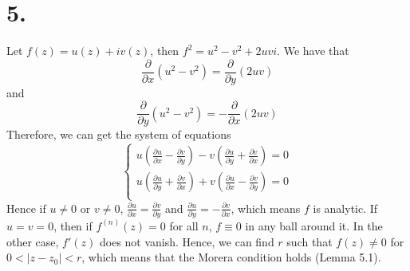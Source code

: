 \documentclass[11pt]{article}
\begin{document}
\section*{5.}
Let $f(z) = u(z) + iv(z)$, then $f^2 = u^2-v^2+2uvi$. We have that 
\[
    \frac{\partial }{\partial x}(u^2-v^2) = \frac{\partial }{\partial y}(2uv)    
\]
and 
\[
    \frac{\partial }{\partial y}(u^2-v^2) = -\frac{\partial }{\partial x}(2uv)
\]
Therefore, we can get the system of equations
\[
\begin{cases}
    u \left(\frac{\partial u}{\partial x} -  \frac{\partial v}{\partial y}\right) - v \left(\frac{\partial u}{\partial y} +  \frac{\partial v}{\partial x}\right) = 0 \\
    u \left(\frac{\partial u}{\partial y} +  \frac{\partial v}{\partial x}\right) + v \left(\frac{\partial u}{\partial x} -  \frac{\partial v}{\partial y}\right) = 0 \\
\end{cases}
\]
Hence if $u \ne 0$ or $v\ne 0$, $\frac{\partial u}{\partial x} = \frac{\partial v}{\partial y}$ and $\frac{\partial u}{\partial y} = - \frac{\partial v}{\partial x}$, which means $f$ is analytic.
If $u = v =0$, then if $f^{(n)}(z) = 0$ for all $n$, $f \equiv 0$ in any ball around it.
In the other case, $f'(z)$ does not vanish. Hence, we can find $r$ such that $f(z) \ne 0$ for $0<|z-z_0| < r$, which means that the Morera condition holds (Lemma 5.1).
\end{document}
